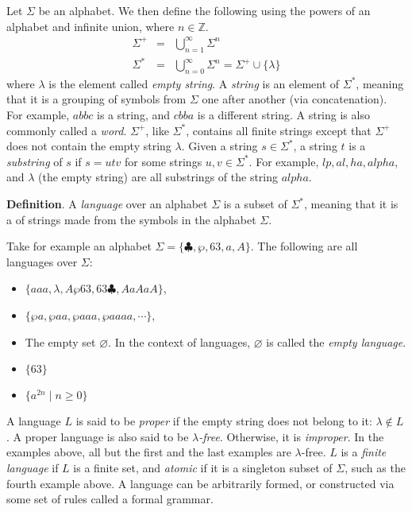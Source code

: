 \documentclass{article}
\begin{document}
Let $\Sigma$ be an alphabet. We then define the following using the
powers of an alphabet and infinite union, where $n \in \mathbb{Z}$.
\begin{eqnarray*}
\Sigma^+ & = & \bigcup_{n=1}^{\infty} \Sigma^n \\
\Sigma^* & = & \bigcup_{n=0}^{\infty} \Sigma^n = \Sigma^+ \cup \{\lambda\}
\end{eqnarray*}
where $\lambda$ is the element called \emph{empty string}.
A \emph{string} is an element of $\Sigma^*$, meaning that
it is a grouping of symbols from $\Sigma$ one after another (via concatenation). For example, $abbc$ is a
string, and $cbba$ is a different string.  A string is also commonly called a \emph{word}.  
$\Sigma^+$, like $\Sigma^*$, contains all finite strings except that
$\Sigma^+$ does not contain the empty string $\lambda$.
Given a string $s\in\Sigma^*$, a string $t$ is a \emph{substring} of $s$ if
$s = utv$ for some strings $u,v\in\Sigma^*$.  For example, $lp, al, ha, alpha$, and $\lambda$ (the empty string) are all substrings of the string $alpha$.

\textbf{Definition}.  A \emph{language} over an alphabet $\Sigma$ is a subset of $\Sigma^*$, meaning that
it is a  of strings made from the symbols in the alphabet $\Sigma$.

Take for example an alphabet $\Sigma = \{\clubsuit, \wp, 63, a, A \}$.
The following are all languages over $\Sigma$:
\begin{itemize}
\item 
$\{aaa, \lambda, A\wp63, 63\clubsuit, AaAaA\}$, 
\item 
$\{\wp a,\wp aa, \wp aaa, \wp aaaa, \cdots\}$, 
\item The empty set $ \varnothing $.  In the context of languages, $\varnothing$ is called the \emph{empty language}.
\item $\lbrace 63 \rbrace$
\item $\lbrace a^{2n}\mid n\ge 0 \rbrace$
\end{itemize}
A language $L$ is said to be \emph{proper} if the empty string does not belong to it: $\lambda\notin L$.  A proper language is also said to be \emph{$\lambda$-free}.  Otherwise, it is \emph{improper}.  In the examples above, all but the first and the last examples are $\lambda$-free.  $L$ is a \emph{finite language} if $L$ is a finite set, and \emph{atomic} if it is a singleton subset of $\Sigma$, such as the fourth example above.  A language can be arbitrarily formed, or constructed via some set of rules called a formal grammar.
\end{document}
